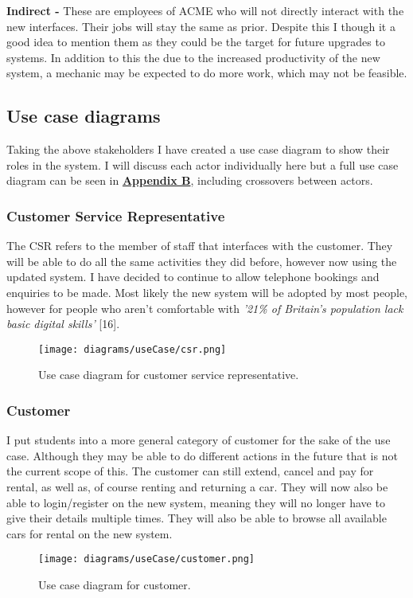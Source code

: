     \vspace{0.2cm}

    \noindent\textbf{Indirect -} These are employees of ACME who will not directly interact with the new interfaces. Their jobs will stay the same as prior. Despite
    this I though it a good idea to mention them as they could be the target for future upgrades to systems. In addition to this the due to the increased 
    productivity of the new system, a mechanic may be expected to do more work, which may not be feasible.

  \subsection{Use case diagrams}
    Taking the above stakeholders I have created a use case diagram to show their roles in the system. I will discuss each actor individually here but a full
    use case diagram can be seen in \hyperref[sec:AppendixB]{\textbf{Appendix B}}, including crossovers between actors.

    \subsubsection{Customer Service Representative}
      The CSR refers to the member of staff that interfaces with the customer. They will be able to do all the same activities they did before, however now using
      the updated system. I have decided to continue to allow telephone bookings and enquiries to be made. Most likely the new system will be
      adopted by most people, however for people who aren't comfortable with \textit{'21\% of Britain's population lack basic digital
      skills'} [16].
      \begin{figure}[H]
        \centering
        \texttt{[image: diagrams/useCase/csr.png]}
        \caption{Use case diagram for customer service representative.}
        \label{fig:UCcsr}
      \end{figure}

    \subsubsection{Customer}
      I put students into a more general category of customer for the sake of the use case. Although they may be able to do different actions in the future
      that is not the current scope of this. The customer can still extend, cancel and pay for rental, as well as, of course renting and returning a car.
      They will now also be able to login/register on the new system, meaning they will no longer have to give their details multiple times. They will also 
      be able to browse all available cars for rental on the new system.  
      \begin{figure}[H]
        \centering
        \texttt{[image: diagrams/useCase/customer.png]}
        \caption{Use case diagram for customer.}
        \label{fig:UCcustomer}
      \end{figure}
    
